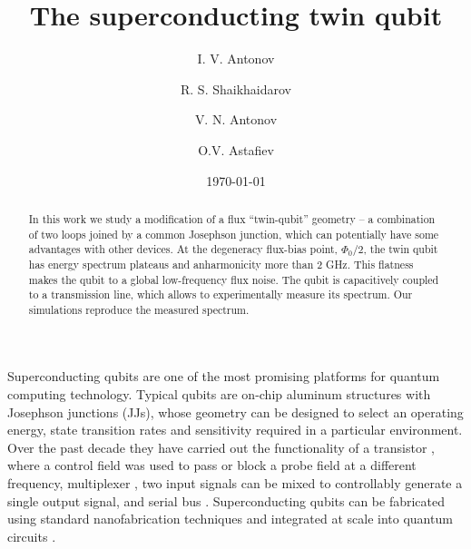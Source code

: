 \documentclass[%
reprint,
superscriptaddress,
bibnotes,
amsmath,
amssymb,
aps,
showkeys,
prb,
]{revtex4-2}
\begin{document}

\title{The superconducting twin qubit}

\author{I.  V.  Antonov}   

\author{R. S.  Shaikhaidarov} 

\author{V.  N.  Antonov}   

\author{O.V.  Astafiev}   

\date{\today}%

\begin{abstract}
  In this work  we study a modification of  a flux ``twin-qubit'' geometry --  a combination of
  two loops joined by a common Josephson  junction, which can potentially have some advantages
  with other devices.  At the degeneracy flux-bias point, $ \Phi_0/2 $, the twin qubit has energy
  spectrum plateaus and anharmonicity more than 2 GHz. This flatness makes the qubit to
  a global  low-frequency flux  noise.  The  qubit is capacitively  coupled to  a transmission
  line, which  allows to experimentally  measure its  spectrum. Our simulations  reproduce the
  measured spectrum.
\end{abstract}


\maketitle

Superconducting  qubits  are  one  of  the most  promising  platforms  for  quantum  computing
technology. Typical  qubits are  on-chip aluminum structures  with Josephson  junctions (JJs),
whose geometry  can be  designed to  select an  operating energy,  state transition  rates and
sensitivity required in a particular environment.  Over  the past decade they have carried out
the   functionality   of   a   transistor   \cite{Astafiev_2010,   Hoi_2011,   Abdumalikov_2010,
  Astafiev_2010_2},  where a  control field  was used  to pass or block a  probe field  at a
different  frequency,  multiplexer  \cite{H_nigl_Decrinis_2018},  two  input signals  can  be  mixed  to
controllably generate a single output signal, and serial bus \cite{Shen_2005}.  Superconducting
qubits can  be fabricated using  standard nanofabrication  techniques and integrated  at scale
into quantum circuits \cite{Johnson_2010}.
\end{document}
